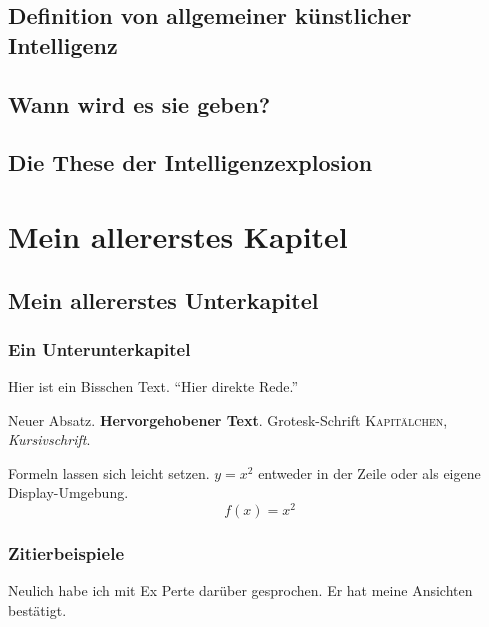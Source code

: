 \section{Definition von allgemeiner künstlicher Intelligenz}
\section{Wann wird es sie geben?}
\section{Die These der Intelligenzexplosion}



\chapter{Mein allererstes Kapitel}
\section{Mein allererstes Unterkapitel}
\subsection{Ein Unterunterkapitel}

Hier ist ein Bisschen    
 {\Huge Text}. "`Hier direkte Rede."'
 
Neuer Absatz. \textbf{Hervorgehobener Text}. \textsf{Grotesk-Schrift}
\textsc{Kapitälchen}, \textit{Kursivschrift}.

Formeln lassen sich leicht setzen. $y=x^2$ entweder in der Zeile oder als
eigene Display-Umgebung.
\begin{equation}
f(x)=x^2
\end{equation}

\subsection{Zitierbeispiele}
Neulich habe ich mit Ex Perte darüber gesprochen. Er hat meine Ansichten
bestätigt.


